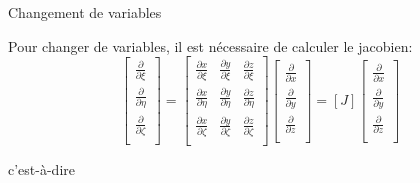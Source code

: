 \documentclass[
mode=present,    %
paper=a4paper,   %
orient=landscape,
display=slides,   %
size=10pt,     %
style=romain   %
]{powerdot}
\begin{document}
\begin{slide}[toc=Chgt de variables]{Changement de variables}

Pour changer de variables, il est nécessaire de calculer le jacobien:
\begin{equation*}
     \begin{bmatrix}
\frac{\partial}{\partial\xi} \\
\frac{\partial}{\partial\eta} \\
\frac{\partial}{\partial\zeta} \\
    \end{bmatrix}
=
     \begin{bmatrix}
\frac{\partial x}{\partial\xi} & \frac{\partial y}{\partial\xi} & \frac{\partial z}{\partial\xi}   \\
\frac{\partial x}{\partial\eta} & \frac{\partial y}{\partial\eta} & \frac{\partial z}{\partial\eta}   \\
\frac{\partial x}{\partial\zeta} & \frac{\partial y}{\partial\zeta} & \frac{\partial z}{\partial\zeta}   \\
    \end{bmatrix}
     \begin{bmatrix}
\frac{\partial}{\partial x} \\
\frac{\partial}{\partial y} \\
\frac{\partial}{\partial z} \\
    \end{bmatrix}
       = [J]
            \begin{bmatrix}
\frac{\partial}{\partial x} \\
\frac{\partial}{\partial y} \\
\frac{\partial}{\partial z} \\
    \end{bmatrix}
\end{equation*}

c'est-à-dire


\end{slide}
\end{document}
